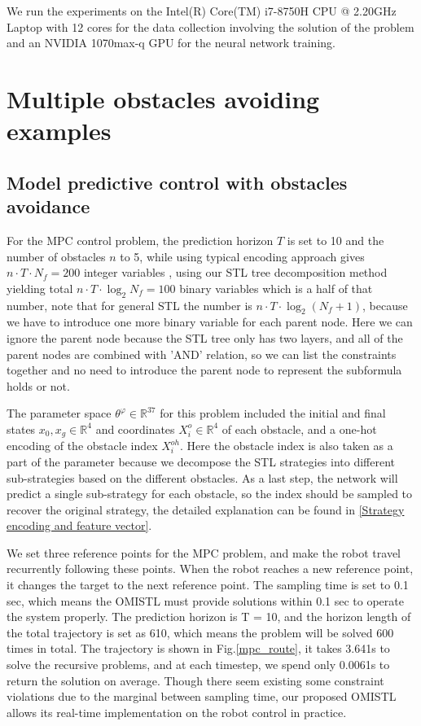 \documentclass[a4paper]{report}
\begin{document}
We run the experiments on the Intel(R) Core(TM) i7-8750H CPU @ 2.20GHz Laptop with 12 cores for the data collection involving the solution of the problem and an NVIDIA 1070max-q GPU for the neural network training. 

\section{Multiple obstacles avoiding examples}
\subsection{Model predictive control with obstacles avoidance}
For the MPC control problem, the prediction horizon $T$ is set to 10 and the number of obstacles $n$ to 5, while using typical encoding approach gives $n\cdot T\cdot N_f = 200$ integer variables \cite[]{2019Formal}, using our STL tree decomposition method yielding total $n\cdot T\cdot \log_2N_f = 100$ binary variables which is a half of that number, note that for general STL the number is $n\cdot T\cdot \log_2(N_f+1)$, because we have to introduce one more binary variable for each parent node. Here we can ignore the parent node because the STL tree only has two layers, and all of the parent nodes are combined with 'AND' relation, so we can list the constraints together and no need to introduce the parent node to represent the subformula holds or not.

The parameter space $\theta^\varphi \in \mathbb{R}^{37}$ for this problem included the initial and final states $x_0,x_g \in \mathbb{R}^4$ and coordinates $X_i^o \in \mathbb{R}^4$ of each obstacle, and a one-hot encoding of the obstacle index $X_i^{oh}$. Here the obstacle index is also taken as a part of the parameter because we decompose the STL strategies into different sub-strategies based on the different obstacles. As a last step, the network will predict a single sub-strategy for each obstacle, so the index should be sampled to recover the original strategy, the detailed explanation can be found in \ref{Strategy encoding and feature vector}.

 We set three reference points for the MPC problem, and make the robot travel recurrently following these points. When the robot reaches a new reference point, it changes the target to the next reference point. The sampling time is set to 0.1 sec, which means the OMISTL must provide solutions within 0.1 sec to operate the system properly. The prediction horizon is T = 10, and the horizon length of the total trajectory is set as 610, which means the problem will be solved 600 times in total. 
 The trajectory is shown in Fig.\ref*{mpc_route}, it takes 3.641s to solve the recursive problems, and at each timestep, we spend only 0.0061s to return the solution on average. Though there seem existing some constraint violations due to the marginal between sampling time, our proposed OMISTL allows its real-time implementation on the robot control in practice.
\end{document}
